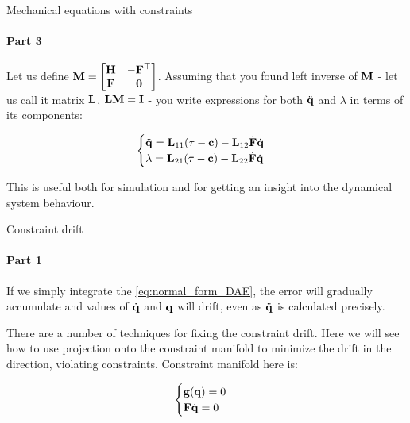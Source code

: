 \documentclass{beamer}
\begin{document}
\begin{frame}{Mechanical equations with constraints}
\framesubtitle{Part 3}
\begin{flushleft}

Let us define $\mathbf{M} = \begin{bmatrix}
    \mathbf{H} & -\mathbf{F}^\top \\
    \mathbf{F} & \mathbf{0}
\end{bmatrix}$. Assuming that you found left inverse of $\mathbf{M}$ - let us call it matrix $\mathbf{L}$, $\mathbf{L}\mathbf{M} = \mathbf{I}$ - you write expressions for both $\ddot{\mathbf{q}}$ and $\lambda$ in terms of its components:

\begin{equation}
\label{eq:normal_form_DAE}
    \begin{cases}
        \ddot{\mathbf{q}} = 
        \mathbf{L}_{11} ( \tau - \mathbf{c}) - \mathbf{L}_{12} \dot{\mathbf{F}} \dot{\mathbf{q}} \\ 
        \lambda = \mathbf{L}_{21} ( \tau - \mathbf{c}) - \mathbf{L}_{22} \dot{\mathbf{F}} \dot{\mathbf{q}}
    \end{cases}
\end{equation}

This is useful both for simulation and for getting an insight into the dynamical system behaviour. 

\end{flushleft}
\end{frame}





\begin{frame}{Constraint drift}
\framesubtitle{Part 1}
\begin{flushleft}

If we simply integrate the \eqref{eq:normal_form_DAE}, the error will gradually accumulate and values of $\dot{\mathbf{q}}$ and $\mathbf{q}$ will drift, even as $\ddot{\mathbf{q}}$ is calculated precisely.

\bigskip

There are a number of techniques for fixing the constraint drift. Here we will see how to use projection onto the constraint manifold to minimize the drift in the direction, violating constraints. Constraint manifold here is:

\begin{equation}
\begin{cases}
    \mathbf{g}(\mathbf{q}) = 0 \\
    \mathbf{F} \dot{\mathbf{q}} = 0
\end{cases}
\end{equation}

\end{flushleft}
\end{frame}
\end{document}
